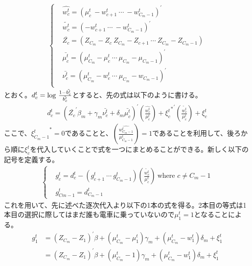 \documentclass{jsarticle}
\begin{document}
\begin{align*}
	\begin{cases}
	&\hat{w_c^t} = \left( \mu_c^t\  -w_{c+1}^t\  \cdots\  -w_{C_m-1}^t\right)^{'}\\[8pt]
	&\tilde{w_c^t} =  \left( -w_{c+1}^t\  \cdots\  -w_{C_m-1}^t\right)^{'}\\[8pt]
	&\bar{Z_c} = \left(Z_{C_m} - Z_c\ Z_{C_m} - Z_{c+1}\ \cdots\ Z_{C_m} - Z_{C_m - 1}\right)\\[8pt]
	&\bar{\mu_c^t} = \left( \mu_{C_m}^t - \mu_c^t\ \cdots\ \mu_{C_m} - \mu_{C_m-1} \right)^{'}\\[8pt]
	&\bar{\nu_c^t} = \left( \mu_{C_m}^t - w_c^t\ \cdots\ \mu_{C_m} - w_{C_m-1} \right)^{'}\\[8pt]
	\end{cases}
\end{align*}
とおく。$d_c^t = {\rm log}\ \frac{1 - \tilde{{b_c^t}}}{\tilde{b_c^t}}$とすると、先の式は以下のように書ける。
\begin{align}
	d_c^t = \left( \bar{Z_c}^{'}\beta_m + \gamma_m \bar{\nu_c^t} + \delta_m \bar{\mu_c^t} \right)^{'} \left( \frac{\hat{w_c^t}}{\mu_c^t} \right) + {{\xi_c^t}^{*}}^{'} \left( \frac{\tilde{w_c^t}}{\mu_c^t} \right) + \xi_c^t
\end{align}
ここで、${\xi_{C_m-1}^t}^{*} = 0$であることと、$\left( \frac{\hat{w_{C_m-1}^t}}{\mu_{C_m-1}^t} \right) = 1$であることを利用して、後ろから順に$\xi_c^t$を代入していくことで式を一つにまとめることができる。新しく以下の記号を定義する。
\begin{align*}
\begin{cases}
	&g_c^t = d_c^t - \left( g_{c+1}^t\ \cdots\ g_{C_m-1}^t\right) \left( \frac{\tilde{w_c^t}}{\mu_c^t} \right)\ \text{where $c \neq C_m -1$}\\[8pt]
	&g_{Cm-1}^t = d_{C_m-1}^t
\end{cases}
\end{align*}
これを用いて、先に述べた逐次代入より以下の1本の式を得る。2本目の等式は1本目の選択に際してはまだ誰も電車に乗っていないので$\mu_1^t = 1$となることによる。
\begin{align*}
	g_1^t &= (Z_{C_m} - Z_1)^{'} \beta + (\mu_{C_m}^t - \mu_1^t)\gamma_m + (\mu_{C_m}^t - w_1^t)\delta_m + \xi_1^t\\[8pt]
	&= (Z_{C_m} - Z_1)^{'} \beta + \left(\mu_{C_m}^t-1\right)\gamma_m + (\mu_{C_m}^t - w_1^t)\delta_m + \xi_1^t
\end{align*}
\end{document}
